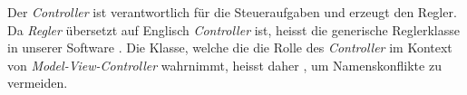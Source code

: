 Der \emph{Controller} ist verantwortlich  f\"ur die Steueraufgaben und erzeugt
den Regler. Da  \emph{Regler} \"ubersetzt auf Englisch  \emph{Controller} ist,
heisst die generische Reglerklasse  in unserer Software . Die
Klasse,  welche   die  die   Rolle  des   \emph{Controller}  im   Kontext  von
\emph{Model-View-Controller} wahrnimmt, heisst  daher , um
Namenskonflikte zu vermeiden.
